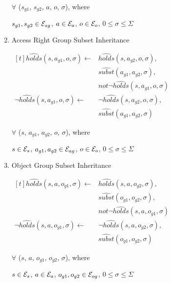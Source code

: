 \documentclass[10pt, twocolumn]{article}
\begin{document}
\begin{enumerate}
                $\forall$ ($s_{g1}$, $s_{g2}$, $a$, $o$, $\sigma$), where

                $s_{g1}, s_{g2} \in {\cal E}_{sg}$,
                $a \in {\cal E}_{a}$,
                $o \in {\cal E}_{o}$,
                $0 \leq \sigma \leq \Sigma$

              \item
                Access Right Group Subset Inheritance

                \begin{math}
                  \begin{aligned}[t]
                    \hat{holds}(s, a_{g1}, o, \sigma) \leftarrow &
                    \hat{holds}(s, a_{g2}, o, \sigma), \\
                    & \hat{subst}(a_{g1}, a_{g2}, \sigma), \\
                    & not \lnot \hat{holds}(s, a_{g1}, o, \sigma) \\
                    \lnot \hat{holds}(s, a_{g1}, o, \sigma) \leftarrow &
                    \lnot \hat{holds}(s, a_{g2}, o, \sigma), \\
                    & \hat{subst}(a_{g1}, a_{g2}, \sigma)
                  \end{aligned}
                \end{math}

                $\forall$ ($s$, $a_{g1}$, $a_{g2}$, $o$, $\sigma$), where

                $s \in {\cal E}_{s}$,
                $a_{g1}, a_{g2} \in {\cal E}_{ag}$,
                $o \in {\cal E}_{o}$,
                $0 \leq \sigma \leq \Sigma$

              \item
                Object Group Subset Inheritance

                \begin{math}
                  \begin{aligned}[t]
                    \hat{holds}(s, a, o_{g1}, \sigma) \leftarrow &
                    \hat{holds}(s, a, o_{g2}, \sigma), \\
                    & \hat{subst}(o_{g1}, o_{g2}, \sigma), \\
                    & not \lnot \hat{holds}(s, a, o_{g1}, \sigma) \\
                    \lnot \hat{holds}(s, a, o_{g1}, \sigma) \leftarrow &
                    \lnot \hat{holds}(s, a, o_{g2}, \sigma), \\
                    & \hat{subst}(o_{g1}, o_{g2}, \sigma)
                  \end{aligned}
                \end{math}

                $\forall$ ($s$, $a$, $o_{g1}$, $o_{g2}$, $\sigma$), where

                $s \in {\cal E}_{s}$,
                $a \in {\cal E}_{a}$,
                $o_{g1}, o_{g2} \in {\cal E}_{og}$,
                $0 \leq \sigma \leq \Sigma$
            \end{enumerate}
\end{document}
